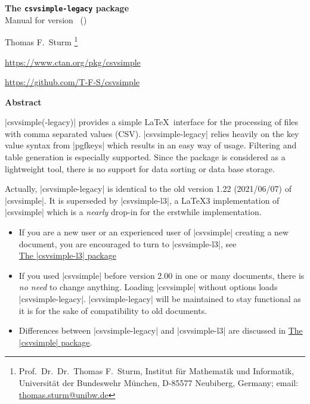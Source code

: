 \documentclass[a4paper,11pt]{ltxdoc}
\begin{document}
\begin{center}
\begin{tcolorbox}[enhanced,hbox,tikznode,left=8mm,right=8mm,boxrule=0.4pt,
  colback=white,colframe=black!50!yellow,
  drop lifted shadow=black!50!yellow,arc is angular,
  before=\par\vspace*{5mm},after=\par\bigskip]
{\bfseries\LARGE The \texttt{csvsimple-legacy} package}\\[3mm]
{\large Manual for version \version\ (\datum)}
\end{tcolorbox}
{\large Thomas F.~Sturm%
  \footnote{Prof.~Dr.~Dr.~Thomas F.~Sturm, Institut f\"{u}r Mathematik und Informatik,
    Universit\"{a}t der Bundeswehr M\"{u}nchen, D-85577 Neubiberg, Germany;
     email: \href{mailto:thomas.sturm@unibw.de}{thomas.sturm@unibw.de}}\par\medskip
\normalsize\url{https://www.ctan.org/pkg/csvsimple}\par
\url{https://github.com/T-F-S/csvsimple}
}
\end{center}
\bigskip
\begin{absquote}
  \begin{center}\bfseries Abstract\end{center}
  |csvsimple(-legacy)| provides a simple \LaTeX\ interface for the processing of files with
  comma separated values (CSV). |csvsimple-legacy| relies heavily on the key value
  syntax from |pgfkeys| which results in an easy way of usage.
  Filtering and table generation is especially supported. Since the package
  is considered as a lightweight tool, there is no support for data sorting
  or data base storage.
\end{absquote}


\begin{tcolorbox}[enhanced,left=8mm,right=8mm,boxrule=2pt,boxsep=3mm,
  colback=red!85!gray!5!white,colframe=red!85!gray,
  arc is angular,arc=5mm,
  before skip=1cm]
Actually, |csvsimple-legacy| is identical to the old version 1.22 (2021/06/07)
of |csvsimple|. It is superseded by |csvsimple-l3|, a \LaTeX3 implementation
of |csvsimple| which is a \emph{nearly} drop-in for the erstwhile implementation.
\begin{itemize}
\item If you are a new user or an experienced user of |csvsimple| creating a
  new document, you are encouraged to turn to |csvsimple-l3|, see\\
  \href{csvsimple-l3.pdf}{\flqq The |csvsimple-l3| package\frqq}
\item If you used |csvsimple| before version 2.00 in one or many documents,
  there is \emph{no need} to change anything. Loading |csvsimple|
  without options loads |csvsimple-legacy|.
  |csvsimple-legacy| will be maintained to stay functional as it is for the
  sake of compatibility to old documents.
\item Differences between |csvsimple-legacy| and |csvsimple-l3| are
  discussed in \href{csvsimple.pdf}{\flqq The |csvsimple| package\frqq}.
\end{itemize}
\end{tcolorbox}
\end{document}
